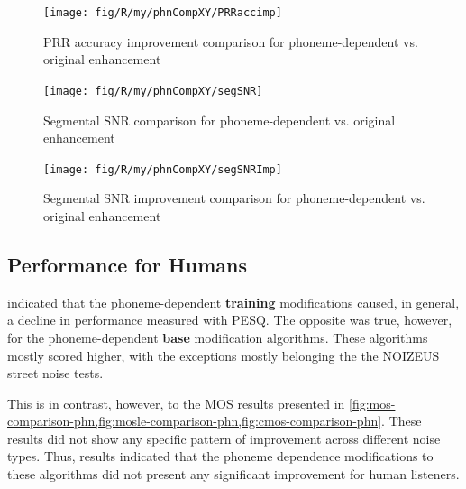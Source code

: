 \begin{figure}[H]
\noindent \begin{centering}
\texttt{[image: fig/R/my/phnCompXY/PRRaccimp]}
\par\end{centering}

\protect\caption{\label{fig:prraccimp-comparison-phn}\acs{PRR} accuracy improvement
comparison for phoneme-dependent vs. original enhancement}
\end{figure}


\begin{figure}[H]
\noindent \begin{centering}
\texttt{[image: fig/R/my/phnCompXY/segSNR]}
\par\end{centering}

\protect\caption{\label{fig:segsnr-comparison-phn}Segmental \acs{SNR} comparison
for phoneme-dependent vs. original enhancement}
\end{figure}


\begin{figure}[H]
\noindent \begin{centering}
\texttt{[image: fig/R/my/phnCompXY/segSNRImp]}
\par\end{centering}

\protect\caption{\label{fig:segsnrimp-comparison-phn}Segmental \acs{SNR} improvement
comparison for phoneme-dependent vs. original enhancement}
\end{figure}



\subsection{Performance for Humans}

 indicated that the phoneme-dependent
\textbf{training} modifications caused, in general, a decline in performance
measured with \ac{PESQ}. The opposite was true, however, for the
phoneme-dependent \textbf{base} modification algorithms. These algorithms
mostly scored higher, with the exceptions mostly belonging the the
NOIZEUS street noise tests.

This is in contrast, however, to the \ac{MOS} results presented in
\cref{fig:mos-comparison-phn,fig:mosle-comparison-phn,fig:cmos-comparison-phn}.
These results did not show any specific pattern of improvement across
different noise types. Thus, results indicated that the phoneme dependence
modifications to these algorithms did not present any significant
improvement for human listeners.

